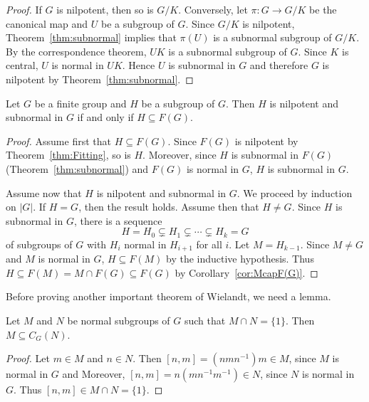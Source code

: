 \begin{proof}
	If $G$ is nilpotent, then so is $G/K$. Conversely, let 
	$\pi\colon G\to G/K$ be the canonical map and $U$ be a subgroup of $G$. Since 
	$G/K$ is nilpotent, Theorem~\ref{thm:subnormal} implies that 
	$\pi(U)$ is a subnormal subgroup of $G/K$. By the correspondence theorem, 
 	$UK$ is a subnormal subgroup of $G$. Since $K$ is central, $U$ is normal in 
	$UK$. Hence $U$ is subnormal in $G$ and therefore $G$ is nilpotent by Theorem~\ref{thm:subnormal}.
\end{proof}

\begin{theorem}
	\label{thm:F(G)subnormalidad}
	Let $G$ be a finite group and $H$ be a subgroup of $G$. Then $H$ is nilpotent and subnormal in $G$ if and only if 
    $H\subseteq F(G)$.
\end{theorem}

\begin{proof}
	Assume first that $H\subseteq F(G)$. Since $F(G)$ is nilpotent by Theorem~\ref{thm:Fitting}, 
    so is $H$. Moreover, since $H$ is subnormal in $F(G)$ (Theorem~\ref{thm:subnormal}) 
    and $F(G)$ is normal in $G$, $H$ is
	subnormal in $G$.

	Assume now that $H$ is nilpotent and subnormal in $G$. We proceed by induction on $|G|$. 
    If $H=G$, then the result holds. Assume then that $H\ne G$. Since $H$ is subnormal in $G$, there is a sequence 
	\[
		H=H_0\subsetneq H_1\subsetneq\cdots\subsetneq H_k=G
	\]
    of subgroups of $G$ with $H_i$ normal in $H_{i+1}$ for all $i$. 
	Let $M=H_{k-1}$. Since $M\ne G$ and $M$ is normal in $G$, 
	$H\subseteq F(M)$ by the inductive hypothesis. Thus $H\subseteq F(M)=M\cap
	F(G)\subseteq F(G)$ by Corollary~\ref{cor:McapF(G)}.
\end{proof}

Before proving another important theorem of Wielandt, we need a lemma. 

\begin{lemma}
	\label{lem:McapN=1}
	Let $M$ and $N$ be normal subgroups of $G$ such that $M\cap N=\{1\}$.
	Then $M\subseteq C_G(N)$.
\end{lemma}

\begin{proof}
	Let $m\in M$ and $n\in N$. Then $[n,m]=(nmn^{-1})m\in M$, since $M$ is normal in $G$ and 
	Moreover, $[n,m]=n(mn^{-1}m^{-1})\in N$, since $N$ is normal in 
	$G$. Thus $[n,m]\in M\cap N=\{1\}$.
\end{proof}

